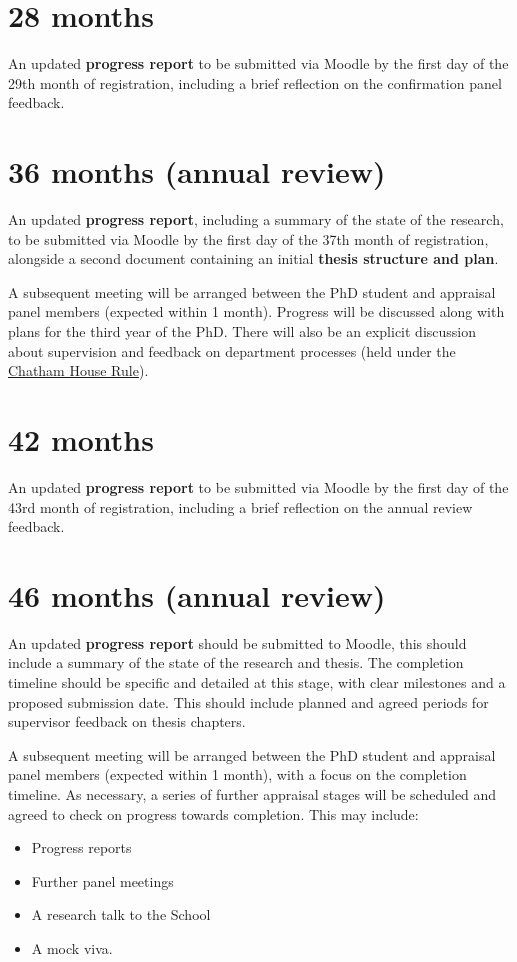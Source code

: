 \documentclass[12pt,a4paper]{article}
\begin{document}
\section{28 months}
An updated \textbf{progress report} to be submitted via Moodle by the first day of the 29th month of registration, including a brief reflection on the confirmation panel feedback.


\section{36 months (annual review)}
An updated \textbf{progress report}, including a summary of the state of the research, to be submitted via Moodle by the first day of the 37th month of registration, alongside a second document containing an initial \textbf{thesis structure and plan}.

A subsequent meeting will be arranged between the PhD student and appraisal panel members (expected within 1 month). Progress will be discussed along with plans for the third year of the PhD. There will also be an explicit discussion about supervision and feedback on department processes (held under the \href{https://www.chathamhouse.org/chatham-house-rule}{Chatham House Rule}).


\section{42 months}
An updated \textbf{progress report} to be submitted via Moodle by the first day of the 43rd month of registration, including a brief reflection on the annual review feedback.


\section{46 months (annual review)}
An updated \textbf{progress report} should be submitted to Moodle, this should include a summary of the state of the research and thesis. The completion timeline should be specific and detailed at this stage, with clear milestones and a proposed submission date. This should include planned and agreed periods for supervisor feedback on thesis chapters.

A subsequent meeting will be arranged between the PhD student and appraisal panel members (expected within 1 month), with a focus on the completion timeline. As necessary, a series of further appraisal stages will be scheduled and agreed to check on progress towards completion. This may include:
\begin{itemize}
	\item Progress reports
	\item Further panel meetings
	\item A research talk to the School
	\item A mock viva.
\end{itemize}
\end{document}

